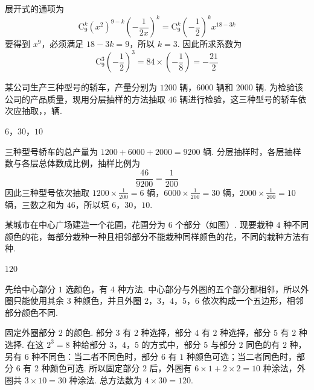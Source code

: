 \begin{solution}
展开式的通项为
\[
\mathrm C_{9}^{k}(x^{2})^{9-k}\left(-\frac1{2x}\right)^{k}=\mathrm C_{9}^{k}\left(-\frac12\right)^{k}x^{18-3k}
\]
要得到 \(x^{9}\)，必须满足 \(18-3k=9\)，所以 \(k=3\). 因此所求系数为
\[
\mathrm C_{9}^{3}\left(-\frac12\right)^{3}=84\times\left(-\frac18\right)=-\frac{21}{2}
\]
\end{solution}

\begin{problem}
某公司生产三种型号的轿车，产量分别为 \(1200\) 辆，\(6000\) 辆和 \(2000\) 辆. 为检验该公司的产品质量，现用分层抽样的方法抽取 \(46\) 辆进行检验，这三种型号的轿车依次应抽取\fillinblank{}，\fillinblank{}，\fillinblank{}辆.
\end{problem}

\begin{answer}
\(6\)，\(30\)，\(10\)
\end{answer}

\begin{solution}
三种型号轿车的总产量为 \(1200+6000+2000=9200\) 辆. 分层抽样时，各层抽样数与各层总体数成比例，抽样比例为
\[
\frac{46}{9200}=\frac1{200}
\]
因此三种型号依次抽取 \(1200\times\frac1{200}=6\) 辆，\(6000\times\frac1{200}=30\) 辆，\(2000\times\frac1{200}=10\) 辆，三数之和为 \(46\)，所以填 \(6\)，\(30\)，\(10\).
\end{solution}

\begin{problem}
某城市在中心广场建造一个花圃，花圃分为 \(6\) 个部分（如图）. 现要栽种 \(4\) 种不同颜色的花，每部分栽种一种且相邻部分不能栽种同样颜色的花，不同的栽种方法有\fillinblank{}种.
\end{problem}

\begin{answer}
\(120\)
\end{answer}

\begin{solution}
先给中心部分 \(1\) 选颜色，有 \(4\) 种方法. 中心部分与外圈的五个部分都相邻，所以外圈只能使用其余 \(3\) 种颜色，并且外圈 \(2\)，\(3\)，\(4\)，\(5\)，\(6\) 依次构成一个五边形，相邻部分颜色不同.

固定外圈部分 \(2\) 的颜色. 部分 \(3\) 有 \(2\) 种选择，部分 \(4\) 有 \(2\) 种选择，部分 \(5\) 有 \(2\) 种选择. 在这 \(2^{3}=8\) 种给部分 \(3\)，\(4\)，\(5\) 的方式中，部分 \(5\) 与部分 \(2\) 同色的有 \(2\) 种，另有 \(6\) 种不同色：当二者不同色时，部分 \(6\) 有 \(1\) 种颜色可选；当二者同色时，部分 \(6\) 有 \(2\) 种颜色可选. 所以固定部分 \(2\) 后，外圈有 \(6\times1+2\times2=10\) 种涂法，外圈共 \(3\times10=30\) 种涂法. 总方法数为 \(4\times30=120\).
\end{solution}

